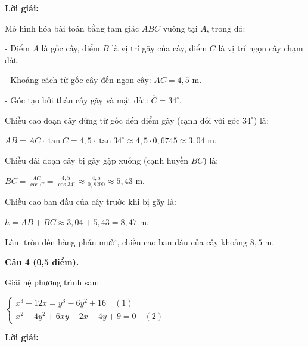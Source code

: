\documentclass[12pt,a4paper]{article}
\begin{document}
\noindent\textbf{Lời giải:}

Mô hình hóa bài toán bằng tam giác $ABC$ vuông tại $A$, trong đó:\par - Điểm $A$ là gốc cây, điểm $B$ là vị trí gãy của cây, điểm $C$ là vị trí ngọn cây chạm đất.\par - Khoảng cách từ gốc cây đến ngọn cây: $AC = 4{,}5\text{ m}$.\par - Góc tạo bởi thân cây gãy và mặt đất: $\widehat{C} = 34^\circ$.\par Chiều cao đoạn cây đứng từ gốc đến điểm gãy (cạnh đối với góc $34^\circ$) là:\par $AB = AC \cdot \tan C = 4{,}5 \cdot \tan 34^\circ \approx 4{,}5 \cdot 0{,}6745 \approx 3{,}04\text{ m}$.\par Chiều dài đoạn cây bị gãy gập xuống (cạnh huyền $BC$) là:\par $BC = \frac{AC}{\cos C} = \frac{4{,}5}{\cos 34^\circ} \approx \frac{4{,}5}{0{,}8290} \approx 5{,}43\text{ m}$.\par Chiều cao ban đầu của cây trước khi bị gãy là:\par $h = AB + BC \approx 3{,}04 + 5{,}43 = 8{,}47\text{ m}$.\par Làm tròn đến hàng phần mười, chiều cao ban đầu của cây khoảng $8{,}5\text{ m}$.

\vspace{3mm}
\noindent\textbf{Câu 4 (0,5 điểm).}

Giải hệ phương trình sau:\par $\begin{cases} x^3 - 12x = y^3 - 6y^2 + 16 \quad (1) \\ x^2 + 4y^2 + 6xy - 2x - 4y + 9 = 0 \quad (2) \end{cases}$

\noindent\textbf{Lời giải:}
\end{document}
